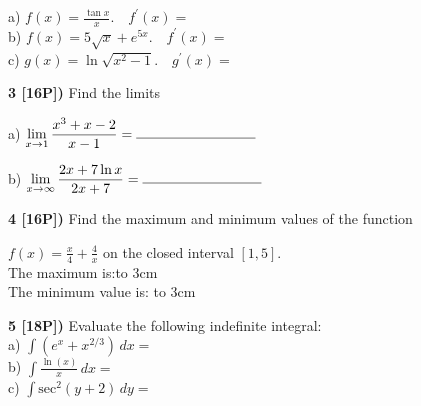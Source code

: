 \documentclass[12pt]{article}
\begin{document}
a) ${\displaystyle f(x) = \frac{\tan x}{x}. \quad f^\prime (x) = }$
\\

b) ${\displaystyle f(x) =  5\sqrt{x}+e^{5x}. \quad
f^\prime (x) = }$
\\

c)  ${\displaystyle g(x) = \ln \sqrt{x^2-1}. \quad
g^\prime (x) = }$

\vspace{3.95in}


{\bf 3 [16P])}  Find the limits

a) $\displaystyle{
\lim_{x\to 1}\frac{x^3 +x -2}{x- 1}=
\hbox  to 3cm{\hrulefill}}$ 

\vspace{.5in}

b) ${\displaystyle \lim_{x\to \infty}\frac{2x+7\ln x}{2x+7}=
\hbox to 3cm{\hrulefill}}$

\vspace{.5in}

{\bf 4 [16P])} Find the maximum and minimum values of
the function 

 $\displaystyle{f(x) = \frac{x}{4} + \frac{4}{x}}$ on the
closed interval $\displaystyle{[1,5]}$.
\\
The maximum is:\hbox to 3cm{\hrulefill}\hspace{1.5cm}\hfill
\\
The minimum value is: \hbox to 3cm{\hrulefill}
\\


\vspace{3.0in}

{\bf 5 [18P])}  Evaluate the following indefinite integral:
\\ %
a) 
$\displaystyle{\int \left( e^x + x^{2/3}
\right)\, dx =}$
\\

b) $\displaystyle{\int \frac{\ln (x)}{x} \, dx=}$
\\

c) $\displaystyle{\int \textrm{sec}^2(y+2) \, dy=}$
\\



\vspace{3.25in}
\end{document}
